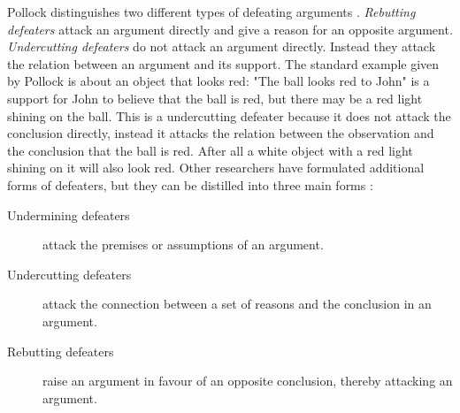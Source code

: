 Pollock distinguishes two different types of defeating arguments
\cite{pollock1995}. \emph{Rebutting defeaters} attack an argument directly and
give a reason for an opposite argument. \emph{Undercutting defeaters} do not
attack an argument directly. Instead they attack the relation between an
argument and its support. The standard example given by Pollock is about an
object that looks red: "The ball looks red to John" is a support for John to
believe that the ball is red, but there may be a red light shining on the ball.
This is a undercutting defeater because it does not attack the conclusion
directly, instead it attacks the relation between the observation and the
conclusion that the ball is red. After all a white object with a red light
shining on it will also look red.
Other researchers have formulated additional forms of defeaters, but they can
be distilled into three main forms \cite{vaneemeren2014}:
\begin{description}
	\item[Undermining defeaters] attack the premises or assumptions of an
	argument.
	\item[Undercutting defeaters] attack the connection between a set of
	reasons and the conclusion in an argument.
	\item[Rebutting defeaters] raise an argument in favour of an opposite
	conclusion, thereby attacking an argument.
\end{description}

